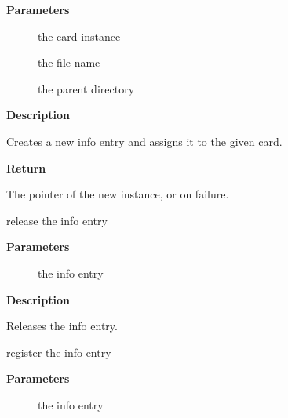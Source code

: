 \documentclass[a4paper,8pt,english]{sphinxmanual}
\begin{document}
\textbf{Parameters}
\begin{description}
\item[{}] \leavevmode
the card instance

\item[{}] \leavevmode
the file name

\item[{}] \leavevmode
the parent directory

\end{description}

\textbf{Description}

Creates a new info entry and assigns it to the given card.

\textbf{Return}

The pointer of the new instance, or  on failure.

\begin{fulllineitems}
\label{sound/kernel-api/alsa-driver-api:c.snd_info_free_entry}
release the info entry

\end{fulllineitems}


\textbf{Parameters}
\begin{description}
\item[{}] \leavevmode
the info entry

\end{description}

\textbf{Description}

Releases the info entry.

\begin{fulllineitems}
\label{sound/kernel-api/alsa-driver-api:c.snd_info_register}
register the info entry

\end{fulllineitems}


\textbf{Parameters}
\begin{description}
\item[{}] \leavevmode
the info entry

\end{description}
\end{document}
